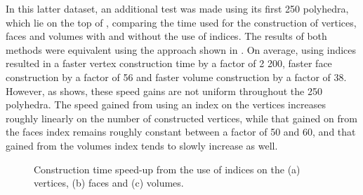 In this latter dataset, an additional test was made using its first 250 polyhedra, which lie on the top of , comparing the time used for the construction of vertices, faces and volumes with and without the use of indices.
The results of both methods were equivalent using the approach shown in .
On average, using indices resulted in a faster vertex construction time by a factor of 2 200, faster face construction by a factor of 56 and faster volume construction by a factor of 38.
However, as  shows, these speed gains are not uniform throughout the 250 polyhedra.
The speed gained from using an index on the vertices increases roughly linearly on the number of constructed vertices, while that gained on from the faces index remains roughly constant between a factor of 50 and 60, and that gained from the volumes index tends to slowly increase as well.
\begin{figure}[tbp]
\centering
{}
\caption[Construction time speed-up from the use of indices]{Construction time speed-up from the use of indices on the (a) vertices, (b) faces and (c) volumes.}
\label{fig:construction-times}
\end{figure}


